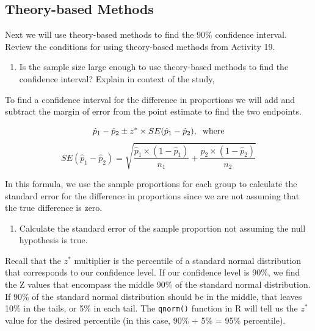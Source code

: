 \documentclass[
]{report}
\providecommand{\tightlist}{%
  \setlength{\itemsep}{0pt}\setlength{\parskip}{0pt}}
\begin{document}
\vspace{1in}

\newpage

\subsection*{Theory-based Methods}\label{theory-based-methods-2}

Next we will use theory-based methods to find the 90\% confidence interval. Review the conditions for using theory-based methods from Activity 19.

\begin{enumerate}
\def\labelenumi{\arabic{enumi}.}
\setcounter{enumi}{9}
\tightlist
\item
  Is the sample size large enough to use theory-based methods to find the confidence interval? Explain in context of the study,
\end{enumerate}

\vspace{1.0in}

To find a confidence interval for the difference in proportions we will add and subtract the margin of error from the point estimate to find the two endpoints.

\[\hat{p}_1-\hat{p}_2\pm z^*\times SE(\hat{p}_1-\hat{p}_2), \hspace{.2cm} \text{where}\]
\[SE(\hat{p}_1-\hat{p}_2) = \sqrt{\frac{\hat{p}_1 \times  (1-\hat{p}_1)}{n_1}+\frac{\hat{p}_2 \times  (1-\hat{p}_2)}{n_2}}\]

In this formula, we use the sample proportions for each group to calculate the standard error for the difference in proportions since we are not assuming that the true difference is zero.

\begin{enumerate}
\def\labelenumi{\arabic{enumi}.}
\setcounter{enumi}{10}
\tightlist
\item
  Calculate the standard error of the sample proportion not assuming the null hypothesis is true.
\end{enumerate}

\vspace{0.5in}

Recall that the \(z^*\) multiplier is the percentile of a standard normal distribution that corresponds to our confidence level. If our confidence level is 90\%, we find the Z values that encompass the middle 90\% of the standard normal distribution. If 90\% of the standard normal distribution should be in the middle, that leaves 10\% in the tails, or 5\% in each tail. The \texttt{qnorm()} function in R will tell us the \(z^*\) value for the desired percentile (in this case, 90\% + 5\% = 95\% percentile).
\end{document}
